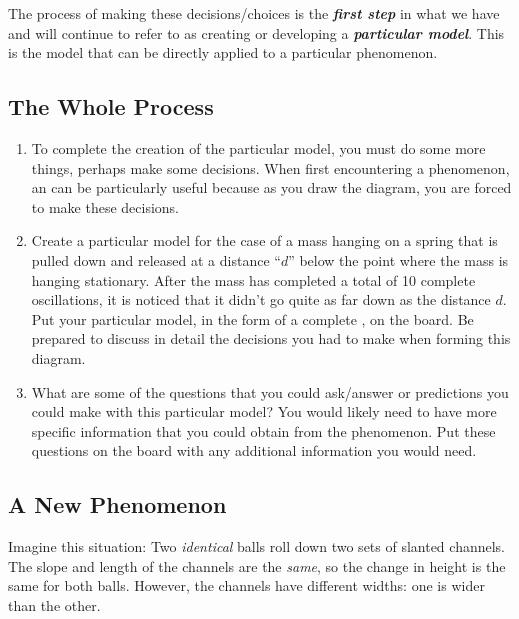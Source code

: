 \noindent The process of making these decisions/choices is the \textbf{\em first step} in what we have and will continue to refer to as creating or developing a \textbf{\em particular model}. This is the model that can be directly applied to a particular phenomenon.

\WCD

\subsection{The Whole Process}

\begin{enumerate}
	\item To complete the creation of the particular model, you must do some more things, perhaps make some decisions. When first encountering a phenomenon, an \EnergyDiagram{} can be particularly useful because as you draw the diagram, you are forced to make these decisions.
	
	\item Create a particular model for the case of a mass hanging on a spring that is pulled down and released at a distance ``$d$'' below the point where the mass is hanging stationary. After the mass has completed a total of 10 complete oscillations, it is noticed that it didn't go quite as far down as the distance $d$. Put your particular model, in the form of a complete \EnergyDiagram{}, on the board. Be prepared to discuss in detail the decisions you had to make when forming this diagram.
	
	\item What are some of the questions that you could ask/answer or predictions you could make with this particular model? You would likely need to have more specific information that you could obtain from the phenomenon. Put these questions on the board with any additional information you would need.
\end{enumerate}

\WCD

\subsection{A New Phenomenon}

Imagine this situation: Two {\em identical} balls roll down two sets of slanted channels. The slope and length of the channels are the {\em same}, so the change in height is the same for both balls. However, the channels have different widths: one is wider than the other.

